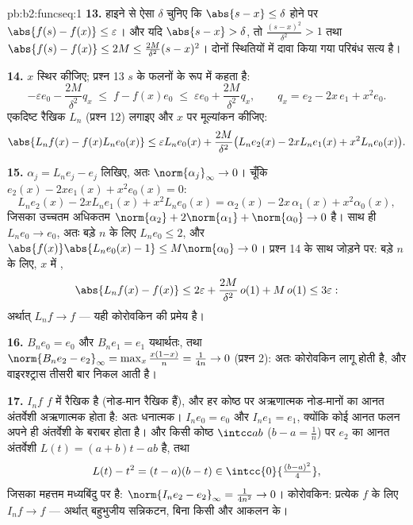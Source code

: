 \begin{solution}{pb:b2:funcseq:1}
\textbf{13.} हाइने से ऐसा $\delta$ चुनिए कि $\abs{s-x} \leq \delta$ होने पर $\abs{f(s)-f(x)}
\leq \varepsilon$। और यदि $\abs{s - x} > \delta$, तो
$\frac{(s-x)^2}{\delta^2} > 1$ तथा $\abs{f(s)-f(x)} \leq 2M \leq \frac{2M}{\delta^2}(s-x)^2$। दोनों स्थितियों में दावा किया गया परिबंध सत्य है।

\textbf{14.} $x$ स्थिर कीजिए; प्रश्न 13 $s$ के फलनों के रूप में कहता है:
\[
-\varepsilon e_0 - \frac{2M}{\delta^2}q_x
\;\leq\; f - f(x)e_0
\;\leq\; \varepsilon e_0 + \frac{2M}{\delta^2}q_x,
\qquad q_x = e_2 - 2x\,e_1 + x^2e_0 .
\]
एकदिष्ट रैखिक $L_n$ (प्रश्न 12) लगाइए और $x$ पर मूल्यांकन कीजिए:
\[
\abs{L_nf(x) - f(x)L_ne_0(x)}
\leq \varepsilon L_ne_0(x)
+ \frac{2M}{\delta^2}\bigl(L_ne_2(x) - 2xL_ne_1(x)
+ x^2L_ne_0(x)\bigr) .
\]

\textbf{15.} $\alpha_j = L_ne_j - e_j$ लिखिए, अतः $\norm{\alpha_j}_\infty \to 0$। चूँकि $e_2(x) - 2xe_1(x) +
x^2e_0(x) = 0$:
\[
L_ne_2(x) - 2xL_ne_1(x) + x^2L_ne_0(x)
= \alpha_2(x) - 2x\,\alpha_1(x) + x^2\alpha_0(x),
\]
जिसका उच्चतम  अधिकतम $\norm{\alpha_2} + 2\norm{\alpha_1} +
\norm{\alpha_0} \to 0$ है। साथ ही  $L_ne_0 \to e_0$, अतः बड़े $n$
के लिए $L_ne_0 \leq 2$, और $\abs{f(x)}\abs{L_ne_0(x) -
1} \leq M\norm{\alpha_0} \to 0$। प्रश्न 14 के साथ जोड़ने पर: बड़े $n$ के लिए, $x$ में
,
\[
\abs{L_nf(x) - f(x)} \leq 2\varepsilon +
\frac{2M}{\delta^2}\,o(1) + M\,o(1) \leq 3\varepsilon :
\]
अर्थात्  $L_nf \to f$ --- यही कोरोवकिन की प्रमेय है।

\textbf{16.} $B_ne_0 = e_0$ और $B_ne_1 = e_1$ यथार्थतः, तथा $\norm{B_ne_2 - e_2}_\infty = \max_x\frac{x(1-x)}{n} =
\frac{1}{4n} \to 0$ (प्रश्न 2): अतः कोरोवकिन लागू
होती है, और वाइरश्ट्रास तीसरी बार निकल आती है।

\textbf{17.} $I_nf$ $f$ में रैखिक है (नोड-मान रैखिक हैं), और हर कोष्ठ पर
अऋणात्मक नोड-मानों का आनत अंतर्वेशी अऋणात्मक होता है: अतः धनात्मक। $I_ne_0 = e_0$
और $I_ne_1 = e_1$, क्योंकि कोई आनत फलन अपने ही अंतर्वेशी के बराबर होता है। और किसी
कोष्ठ $\intcc ab$ ($b - a = \frac1n$) पर $e_2$ का आनत अंतर्वेशी $L(t) = (a+b)t - ab$ है, तथा
\[
L(t) - t^2 = (t-a)(b-t) \in
\intcc{0}{\tfrac{(b-a)^2}{4}} ,
\]
जिसका महत्तम मध्यबिंदु पर है: $\norm{I_ne_2 - e_2}_\infty =
\frac{1}{4n^2} \to 0$। कोरोवकिन: प्रत्येक  $f$ के लिए
 $I_nf \to f$ --- अर्थात् बहुभुजीय सन्निकटन, बिना किसी और आकलन के।


\end{solution}
